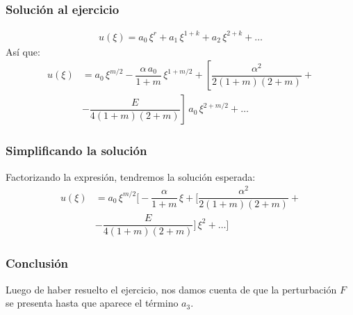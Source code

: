 \begin{frame}
\frametitle{Solución al ejercicio}
\vspace*{-1cm}
\begin{align*}
u(\xi) = a_{0} \, \xi^{r} + a_{1} \, \xi ^{1+k} + a_{2} \, \xi ^{2+k} + \ldots 
\end{align*}
\pause
Así que:   
\begin{align*}
u(\xi) &= a_{0} \, \xi^{m/2} - \dfrac{\alpha \, a_{0}}{1+m} \, \xi^{1+m/2} + \left[ \dfrac{\alpha^{2}}{2(1+m)(2+m)} + \right. \\[0.5em]
&- \left. \dfrac{E}{4(1+m)(2+m)} \right] \, a_{0} \, \xi^{2+m/2} + \ldots
\end{align*}
\end{frame}
\begin{frame}
\frametitle{Simplificando la solución}
Factorizando la expresión, tendremos la solución esperada:
\begin{align*}
u(\xi) &= a_{0} \, \xi^{m/2}  \bigg[ - \dfrac{\alpha}{1+m} \, \xi + \bigg[ \dfrac{\alpha^{2}}{2(1+m)(2+m)} + \\[0.5em]
&- \dfrac{E}{4(1+m)(2+m)} \bigg] \, \xi^{2} + \ldots \bigg]
\end{align*}
\end{frame}
\begin{frame}
\frametitle{Conclusión}
Luego de haber resuelto el ejercicio, nos damos cuenta de que la perturbación $F$ se presenta hasta que aparece el término $a_{3}$.
\end{frame}

